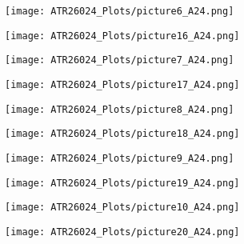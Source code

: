 \begin{figure}[H]
	\centering
	\begin{subfigure}[b]{0.45\textwidth}
		\texttt{[image: ATR26024\_Plots/picture6\_A24.png]}
	\end{subfigure}
	\hfill
	\begin{subfigure}[b]{0.45\textwidth}
		\texttt{[image: ATR26024\_Plots/picture16\_A24.png]}
	\end{subfigure}
\end{figure}

\begin{figure}[H]
	\centering
	\begin{subfigure}[b]{0.45\textwidth}
		\texttt{[image: ATR26024\_Plots/picture7\_A24.png]}
	\end{subfigure}
	\hfill
	\begin{subfigure}[b]{0.45\textwidth}
		\texttt{[image: ATR26024\_Plots/picture17\_A24.png]}
	\end{subfigure}
\end{figure}

\begin{figure}[H]
	\centering
	\begin{subfigure}[b]{0.45\textwidth}
		\texttt{[image: ATR26024\_Plots/picture8\_A24.png]}
	\end{subfigure}
	\hfill
	\begin{subfigure}[b]{0.45\textwidth}
		\texttt{[image: ATR26024\_Plots/picture18\_A24.png]}
	\end{subfigure}
\end{figure}

\begin{figure}[H]
	\centering
	\begin{subfigure}[b]{0.45\textwidth}
		\texttt{[image: ATR26024\_Plots/picture9\_A24.png]}
	\end{subfigure}
	\hfill
	\begin{subfigure}[b]{0.45\textwidth}
		\texttt{[image: ATR26024\_Plots/picture19\_A24.png]}
	\end{subfigure}
\end{figure}

\begin{figure}[H]
	\centering
	\begin{subfigure}[b]{0.45\textwidth}
		\texttt{[image: ATR26024\_Plots/picture10\_A24.png]}
	\end{subfigure}
	\hfill
	\begin{subfigure}[b]{0.45\textwidth}
		\texttt{[image: ATR26024\_Plots/picture20\_A24.png]}
	\end{subfigure}
\end{figure}
